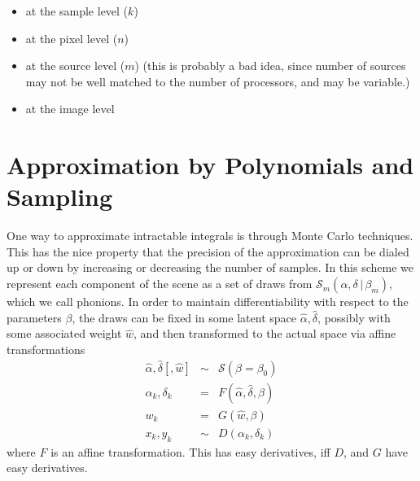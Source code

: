 \documentclass[modern]{aastex62}
\newcommand{\given}{\,|\,}
\newcommand{\scene}{\mathcal{S}}
\begin{document}
{\begin{itemize}
\item at the sample level ($k$)

\item at the pixel level ($n$)

\item at the source level ($m$) (this is probably a bad idea, since number of sources may not be well matched to the number of processors, and may be variable.)

\item at the image level
\end{itemize}


\section{Approximation by Polynomials and Sampling}
One way to approximate intractable integrals is through Monte Carlo techniques.
This has the nice property that the precision of the approximation can be dialed up or down by increasing or decreasing the number of samples.
In this scheme we represent each component of the scene as a set of draws from $\scene_m(\alpha, \delta \given \beta_m)$, which we call phonions.
In order to maintain differentiability with respect to the parameters $\beta$, the draws can be fixed in some latent space $\hat{\alpha}, \hat{\delta}$,
possibly with some associated weight $\hat{w}$,
and then transformed to the actual space via affine transformations
\begin{eqnarray}
\hat{\alpha}, \hat{\delta} [, \hat{w}] & \sim & \scene(\beta=\beta_0) \\
\alpha_k, \delta_k & = & F(\hat{\alpha}, \hat{\delta}, \beta) \nonumber \\
w_k & = & G(\hat{w}, \beta) \nonumber \\
x_k, y_k & \sim & D(\alpha_k, \delta_k) \nonumber
\end{eqnarray}
where $F$ is an affine transformation. This has easy derivatives, iff $D$, and $G$ have easy derivatives.

}
\end{document}

